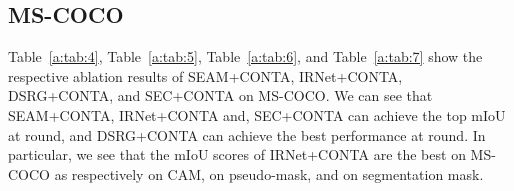 \subsection{MS-COCO}
Table~\ref{a:tab:4}, Table~\ref{a:tab:5}, Table~\ref{a:tab:6}, and Table~\ref{a:tab:7} show the respective ablation results of SEAM+CONTA, IRNet+CONTA, DSRG+CONTA, and SEC+CONTA on MS-COCO.
We can see that SEAM+CONTA, IRNet+CONTA and, SEC+CONTA can achieve the top mIoU at round, and DSRG+CONTA can achieve the best performance at round. In particular, we see that the mIoU scores of IRNet+CONTA are the best on MS-COCO as respectively  on CAM,  on pseudo-mask, and  on segmentation mask.
\begin{table}[t]
\centering
\renewcommand\arraystretch{1.3}
\vspace{3mm}
\caption{Ablation results of SEAM~\cite{wang2020self}+CONTA on MS-COCO~\cite{lin2014microsoft} in mIoU (\%). ``*'' denotes our re-implemented results. ``Seg. Mask'' refers to the segmentation mask of the \emph{val} set. ``--'' denotes that the result is N.A. for the fully-supervised model.}
\label{a:tab:4}
\end{table}
